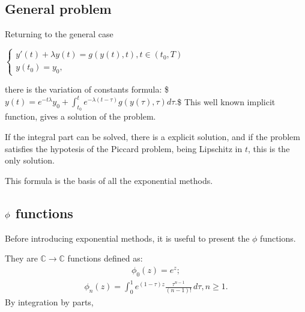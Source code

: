 \documentclass[letterpaper,10pt,english]{jupyterBook}
\begin{document}
\subsection{General problem}
\label{\detokenize{cap3:general-problem}}
\sphinxAtStartPar
Returning to the general case

\sphinxAtStartPar
\(\begin{cases}
    y'(t) + \lambda y(t) = g(y(t), t), t \in (t_0, T) \\
    y(t_0) = y_0 
    \text{,}
\end{cases}\)

\sphinxAtStartPar
there is the variation of constants formula:
\$\(
    y(t) = e^{-t \lambda}y_0 + \int_{t_0}^t e^{-\lambda(t-\tau)} g(y(\tau), \tau) d\tau.
\)\$
This well known implicit function, gives a solution of the problem.

\sphinxAtStartPar
If the integral part can be solved, there is a explicit solution, and if the problem satisfies the hypotesis of the Piccard problem, being Lipschitz in \(t\), this is the only solution.

\sphinxAtStartPar
This formula is the basis of all the exponential methods.


\subsection{\protect\(\phi\protect\) functions}
\label{\detokenize{cap3:phi-functions}}
\sphinxAtStartPar
Before introducing exponential methods, it is useful to present the \(\phi\) functions.

\sphinxAtStartPar
They are \(\mathbb{C} \rightarrow \mathbb{C}\) functions defined as:
\begin{equation*}
\begin{split}
  \phi_0 (z) = e^z;
\end{split}
\end{equation*}\begin{equation*}
\begin{split}
  \phi_n (z) = \int_{0}^{1} e^{(1-\tau)z} \frac{\tau^{n-1}}{(n-1)!} \,d\tau, n \geq 1.
\end{split}
\end{equation*}
\sphinxAtStartPar
By integration by parts,
\end{document}
